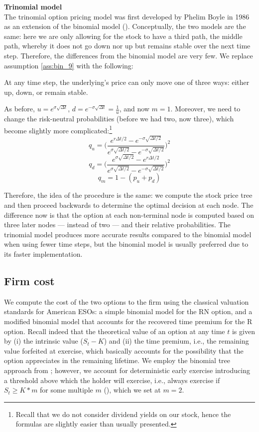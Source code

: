 \textbf{Trinomial model}\\
The trinomial option pricing model was  first developed by Phelim Boyle in 1986 as an extension of the binomial model (\cite{boyle1986option}). Conceptually, the two models are the same: here we are only allowing for the stock to have a third path, the middle path, whereby it does not go down nor up but remains stable over the next time step. Therefore, the differences from the binomial model are very few. We replace assumption \ref*{ass:bin_9} with the following:
\begin{assumption}
    \label{ass:trin_10}
    At any time step, the underlying's price can only move one of three ways: either up, down, or remain stable.
\end{assumption}
As before, $u = e^{\sigma \sqrt{\Delta t}}$, $d = e^{-\sigma \sqrt{\Delta t}}=\frac{1}{u}$, and now $m=1$. Moreover, we need to change the risk-neutral probabilities (before we had two, now three), which become slightly more complicated:\footnote{Recall that we do not consider dividend yields on our stock, hence the formulas are slightly easier than usually presented.}
$$ q_u = \Biggl(\frac{e^{r \Delta t / 2} - e^{-\sigma \sqrt{\Delta t / 2}}}{e^{\sigma \sqrt{\Delta t / 2}} - e^{-\sigma \sqrt{\Delta t / 2}}}\Biggr)^2 $$
$$ q_d = \Biggl(\frac{e^{\sigma \sqrt{\Delta t / 2}} - e^{r \Delta t / 2}}{e^{\sigma \sqrt{\Delta t / 2}} - e^{-\sigma \sqrt{\Delta t / 2}}}\Biggr)^2 $$
$$ q_m = 1 - (p_u + p_d) $$

Therefore, the idea of the procedure is the same: we compute the stock price tree and then proceed backwards to determine the optimal decision at each node. The difference now is that the option at each non-terminal node is computed based on three later nodes --- instead of two --- and their relative probabilities.
The trinomial model produces more accurate results compared to the binomial model when using fewer time steps, but the binomial model is usually preferred due to its faster implementation.

\subsection{Firm cost} 

We compute the cost of the two options to the firm using the classical valuation standards for American ESOs: a simple binomial model for the RN option, and a modified binomial model that accounts for the recovered time premium for the R option.
Recall indeed that the theoretical value of an option at any time $t$ is given by (i) the intrinsic value ($S_t - K$) and (ii) the time premium, i.e., the remaining value forfeited at exercise, which basically accounts for the possibility that the option appreciates in the remaining lifetime.
We employ the binomial tree approach from \cite{cox1979option}; however, we account for deterministic early exercise introducing a threshold above which the holder will exercise, i.e., always exercise if $S_t \ge K*m$ for some multiple $m$ (\cite{hull2004value}), which we set at $m = 2$.

